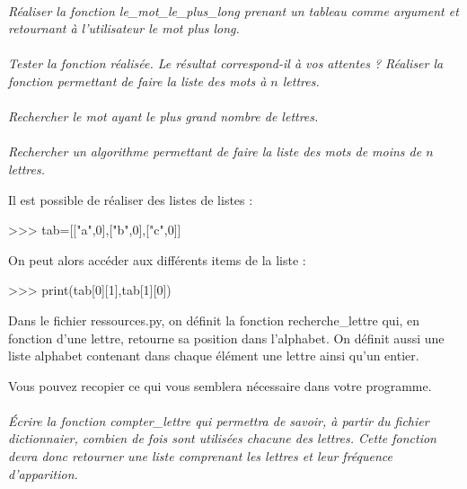 \documentclass[11pt,oneside]{article}
\begin{document}
\paragraph{}
\textit{Réaliser la fonction \textsf{le\_mot\_le\_plus\_long} prenant un tableau comme argument et retournant à l'utilisateur le mot plus long.}

\paragraph{}
\textit{Tester la fonction réalisée. Le résultat correspond-il à vos attentes ? Réaliser la fonction permettant de faire la liste des mots à $n$ lettres.}

\paragraph{}
\textit{Rechercher le mot ayant le plus grand nombre de lettres.}

\paragraph{}
\textit{Rechercher un algorithme permettant de faire la liste des mots de moins de $n$  lettres.}


\begin{py}

Il est possible de réaliser des listes de listes :

\begin{python}
>>> tab=[["a",0],["b",0],["c",0]]
\end{python}

On peut alors accéder aux différents items de la liste :
\begin{python}
>>> print(tab[0][1],tab[1][0])
\end{python}
\end{py}




Dans le fichier \textsf{ressources.py}, on définit la fonction \textsf{recherche\_lettre} qui, en fonction d'une lettre, retourne sa position dans l'alphabet. On définit aussi une liste \textsf{alphabet} contenant dans chaque élément une lettre ainsi qu'un entier.

Vous pouvez recopier ce qui vous semblera nécessaire dans votre programme.

\paragraph{}
\textit{Écrire la fonction \textsf{compter\_lettre} qui permettra de savoir, à partir du fichier dictionnaier, combien de fois sont utilisées chacune des lettres. Cette fonction devra donc retourner une liste comprenant les lettres et leur fréquence d'apparition.}
\end{document}
